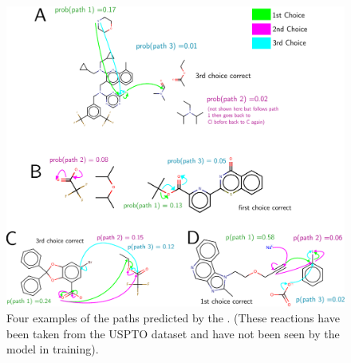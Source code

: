\begin{figure}[h]
        \centering
        \includegraphics[width=1.0\textwidth]{imgs/appendix_examples}
        \caption{Four examples of the paths predicted by the \ourModelIR. (These reactions have been taken from the USPTO dataset and have not been seen by the model in training).}
        \label{fig:appendix_examples}
\end{figure}




